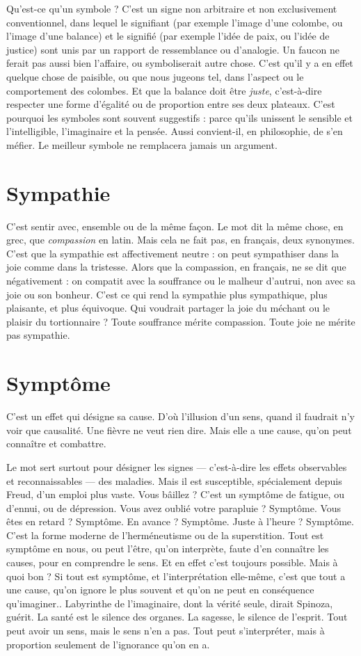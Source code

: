 Qu'est-ce qu’un symbole ? C’est un signe non arbitraire et non exclusivement
conventionnel, dans lequel le signifiant (par exemple l’image d’une
colombe, ou l’image d’une balance) et le signifié (par exemple l’idée de paix, ou
l’idée de justice) sont unis par un rapport de ressemblance ou d’analogie. Un
faucon ne ferait pas aussi bien l'affaire, ou symboliserait autre chose. C’est qu'il
y a en effet quelque chose de paisible, ou que nous jugeons tel, dans l'aspect ou
le comportement des colombes. Et que la balance doit être {\it juste}, c’est-à-dire
respecter une forme d’égalité ou de proportion entre ses deux plateaux. C'est
pourquoi les symboles sont souvent suggestifs : parce qu’ils unissent le sensible
et l’intelligible, l'imaginaire et la pensée. Aussi convient-il, en philosophie, de
s’en méfier. Le meilleur symbole ne remplacera jamais un argument.

\section{Sympathie}
C’est sentir avec, ensemble ou de la même façon. Le mot dit
la même chose, en grec, que {\it compassion} en latin. Mais cela ne
fait pas, en français, deux synonymes. C’est que la sympathie est affectivement
neutre : on peut sympathiser dans la joie comme dans la tristesse. Alors que la
compassion, en français, ne se dit que négativement : on compatit avec la souffrance
ou le malheur d’autrui, non avec sa joie ou son bonheur. C’est ce qui
rend la sympathie plus sympathique, plus plaisante, et plus équivoque. Qui
voudrait partager la joie du méchant ou le plaisir du tortionnaire ? Toute souffrance
mérite compassion. Toute joie ne mérite pas sympathie.

\section{Symptôme}
C’est un effet qui désigne sa cause. D’où l'illusion d’un sens,
quand il faudrait n’y voir que causalité. Une fièvre ne veut rien
dire. Mais elle a une cause, qu’on peut connaître et combattre.

Le mot sert surtout pour désigner les signes — c’est-à-dire les effets observables
et reconnaissables — des maladies. Mais il est susceptible, spécialement
depuis Freud, d’un emploi plus vaste. Vous bâillez ? C’est un symptôme de
fatigue, ou d’ennui, ou de dépression. Vous avez oublié votre parapluie ?
Symptôme. Vous êtes en retard ? Symptôme. En avance ? Symptôme. Juste à
l'heure ? Symptôme. C’est la forme moderne de l’herméneutisme ou de la
superstition. Tout est symptôme en nous, ou peut l'être, qu’on interprète, faute
d'en connaître les causes, pour en comprendre le sens. Et en effet c’est toujours
possible. Mais à quoi bon ? Si tout est symptôme, et l'interprétation elle-même,
c'est que tout a une cause, qu’on ignore le plus souvent et qu’on ne peut en
conséquence qu'imaginer.. Labyrinthe de l'imaginaire, dont la vérité seule,
dirait Spinoza, guérit. La santé est le silence des organes. La sagesse, le silence
de l'esprit. Tout peut avoir un sens, mais le sens n’en a pas. Tout peut s’interpréter,
mais à proportion seulement de l’ignorance qu’on en a.

